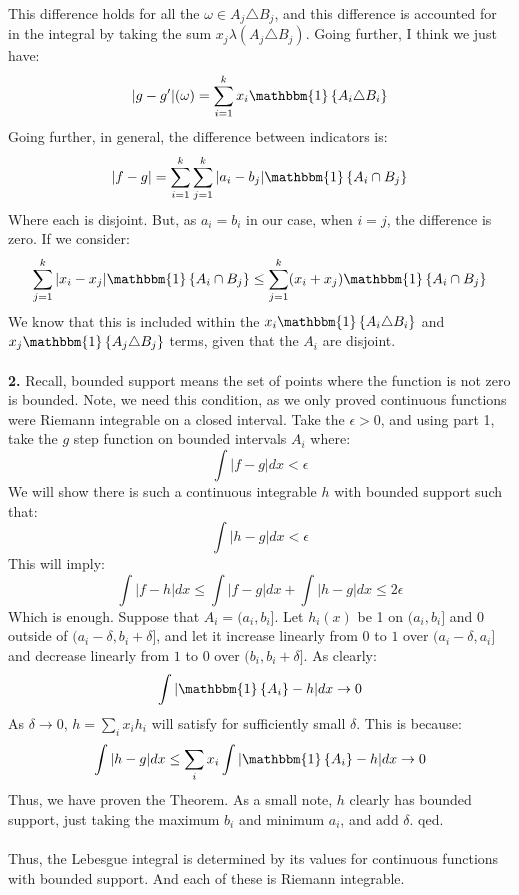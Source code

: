 \documentclass[12pt,a4paper]{article}
\newcommand{\1}[1]{\mathbbm{1}\left\{ #1 \right\}}
\begin{document}
This difference holds for all the $\omega \in A_j \triangle B_j$, and this difference is accounted for in the integral by taking the sum $x_j\lambda(A_j \triangle B_j)$. Going further, I think we just have:
$$
	|g - g'|(\omega) = \sum_{i=1}^k x_i\1{A_i \triangle B_i}
$$
Going further, in general, the difference between indicators is:
$$
	|f - g| = \sum_{i=1}^k \sum_{j=1}^k |a_i - b_j| \1{A_i \cap B_j}
$$
Where each is disjoint. But, as $a_i = b_i$ in our case, when $i = j$, the difference is zero. If we consider:
$$
	\sum_{j=1}^k |x_i - x_j|  \1{A_i \cap B_j} \leq
	\sum_{j=1}^k (x_i + x_j) \1{A_i \cap B_j}
$$
We know that this is included within the $x_i\1{A_i \triangle B_i}$ and $x_j\1{A_j \triangle B_j}$ terms, given that the $A_i$ are disjoint. 
\\\\
\textbf{2.} Recall, bounded support means the set of points where the function is not zero is bounded. Note, we need this condition, as we only proved continuous functions were Riemann integrable on a closed interval. Take the $\epsilon > 0$, and using part 1, take the $g$ step function on bounded intervals $A_i$ where:
$$
	\int |f - g| dx < \epsilon
$$
We will show there is such a continuous integrable $h$ with bounded support such that:
$$
	\int |h - g| dx < \epsilon
$$
This will imply:
$$
	\int |f - h| dx \leq \int |f - g| dx + \int |h - g| dx \leq 2\epsilon
$$
Which is enough. Suppose that $A_i = (a_i, b_i]$. Let $h_i(x)$ be 1 on $(a_i,b_i]$ and $0$ outside of $(a_i - \delta, b_i + \delta]$, and let it increase linearly from $0$ to $1$ over $(a_i - \delta, a_i]$ and decrease linearly from $1$ to $0$ over $(b_i,b_i+\delta]$. As clearly:
$$
	\int |\1{A_i} - h|dx \to 0
$$
As $\delta \to 0$, $h = \sum_i x_ih_i$ will satisfy for sufficiently small $\delta$. This is because:
$$
	\int |h - g| dx \leq \sum_i x_i \int |\1{A_i} - h|dx \to 0
$$
Thus, we have proven the Theorem. As a small note, $h$ clearly has bounded support, just taking the maximum $b_i$ and minimum $a_i$, and add $\delta$. qed.
\\\\
Thus, the Lebesgue integral is determined by its values for continuous functions with bounded support. And each of these is Riemann integrable.
\end{document}
